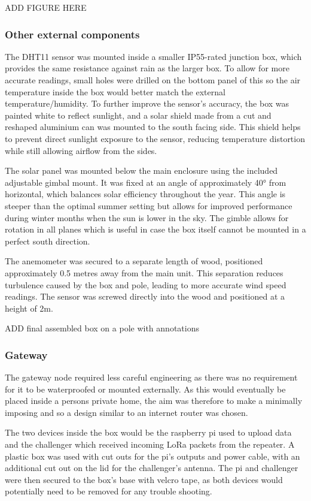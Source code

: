 ADD FIGURE HERE

\subsubsection{Other external components}

The DHT11 sensor was mounted inside a smaller IP55-rated junction box, which
provides the same resistance against rain as the larger box. To allow for more
accurate readings, small holes were drilled on the bottom panel of this so the
air temperature inside the box would better match the external
temperature/humidity. To further improve the sensor's accuracy, the box was
painted white to reflect sunlight, and a solar shield made from a cut and
reshaped aluminium can was mounted to the south facing side. This shield helps
to prevent direct sunlight exposure to the sensor, reducing temperature
distortion while still allowing airflow from the sides.

The solar panel was mounted below the main enclosure using the included
adjustable gimbal mount. It was fixed at an angle of approximately 40° from
horizontal, which balances solar efficiency throughout the year. This angle is
steeper than the optimal summer setting but allows for improved performance
during winter months when the sun is lower in the sky. The gimble allows for
rotation in all planes which is useful in case the box itself cannot be mounted
in a perfect south direction. 

The anemometer was secured to a separate length of wood, positioned
approximately 0.5 metres away from the main unit. This separation reduces
turbulence caused by the box and pole, leading to more accurate wind speed
readings. The sensor was screwed directly into the wood and positioned at a
height of 2m.

ADD final assembled box on a pole with annotations

\subsubsection{Gateway}

The gateway node required less careful engineering as there was no requirement
for it to be waterproofed or mounted externally. As this would eventually be
placed inside a persons private home, the aim was therefore to make a minimally
imposing and so a design similar to an internet router was chosen.

The two devices inside the box would be the raspberry pi used to upload data and
the challenger which received incoming LoRa packets from the repeater. A plastic
box was used with cut outs for the pi's outputs and power cable, with an
additional cut out on the lid for the challenger's antenna. The pi and
challenger were then secured to the box's base with velcro tape, as both devices
would potentially need to be removed for any trouble shooting.